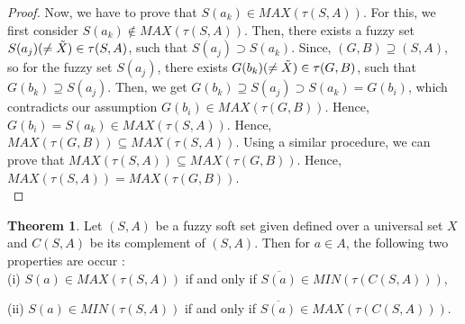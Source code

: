 \documentclass{article}
\theoremstyle{definition}
\newtheorem{theorem}{Theorem}[section]
\begin{document}
\begin{proof}
Now, we have to prove that $S(a_k)\in MAX(\tau(S,A))$. For this, we first consider $S(a_k)\notin MAX(\tau(S,A))$. Then, there exists a fuzzy set $S(a_j)(\neq \Tilde{X})\in \tau(S, A)$, such that $S(a_j) \supset S(a_k)$. Since, $(G,B)\supseteq (S,A)$, so for the fuzzy set $S(a_j)$, there exists $G(b_k) (\neq \Tilde{X})\in \tau(G, B)$, such that $ G(b_k)\supseteq S(a_j)$.
Then, we get $G(b_k)\supseteq S(a_j) \supset S(a_k) = G(b_i)$, which contradicts our assumption $G(b_i) \in MAX(\tau(G,B))$. Hence, $G(b_i)=S(a_k)\in MAX(\tau(S, A))$. Hence, $MAX(\tau(G,B)) \subseteq MAX(\tau(S,A))$. Using a similar procedure, we can prove that $MAX(\tau(S,A)) \subseteq MAX(\tau(G,B))$. Hence, $MAX(\tau(S,A))=MAX(\tau(G,B))$.\\

\end{proof}
 \begin{theorem}
     Let $(S, A)$ be a fuzzy soft set given defined over a universal set $X$ and $C(S,A)$ be its complement of $(S, A)$. Then for $a\in A$, the following two properties are occur :\\

     (i) $S(a) \in MAX(\tau(S,A))$ if and only if   $\overline{S(a)} \in MIN(\tau (C(S,A)))$,

     (ii) $S(a) \in MIN(\tau(S,A))$ if and only if   $\overline{S(a)} \in MAX(\tau (C(S,A)))$.
 \end{theorem}
\end{document}
